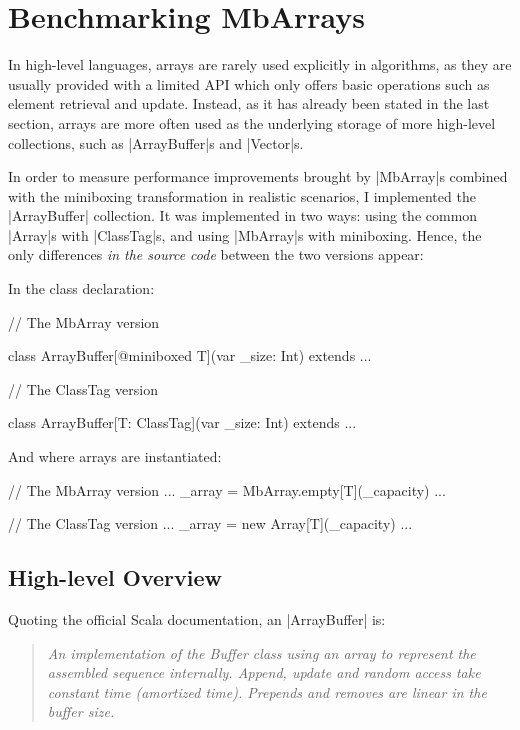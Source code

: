 \section{Benchmarking MbArrays}
\label{sec:bench}

In high-level languages, arrays are rarely used explicitly in algorithms, as they are usually provided with a limited API which only offers basic operations such as element retrieval and update. Instead, as it has already been stated in the last section, arrays are more often used as the underlying storage of more high-level collections, such as |ArrayBuffer|s and |Vector|s.

In order to measure performance improvements brought by |MbArray|s combined with the miniboxing transformation in realistic scenarios, I implemented the |ArrayBuffer| collection. It was implemented in two ways: using the common |Array|s with |ClassTag|s, and using |MbArray|s with miniboxing.
Hence, the only differences \emph{in the source code} between the two versions appear:

In the class declaration: %
  
\begin{lstlisting-nobreak}
// The MbArray version

class ArrayBuffer[@miniboxed T](var _size: Int) 
	extends ...

// The ClassTag version

class ArrayBuffer[T: ClassTag](var _size: Int)   
	extends ...
\end{lstlisting-nobreak}

And where arrays are instantiated:

\begin{lstlisting-nobreak}
// The MbArray version
	...
	_array = MbArray.empty[T](_capacity)
	...

// The ClassTag version
	...
	_array = new Array[T](_capacity)
	...
\end{lstlisting-nobreak}

\subsection{High-level Overview}

Quoting the official Scala documentation, an |ArrayBuffer| is: 
\begin{quote}
\textit{An implementation of the Buffer class using an array to represent the assembled sequence internally. Append, update and random access take constant time (amortized time). Prepends and removes are linear in the buffer size.} 
\end{quote}

